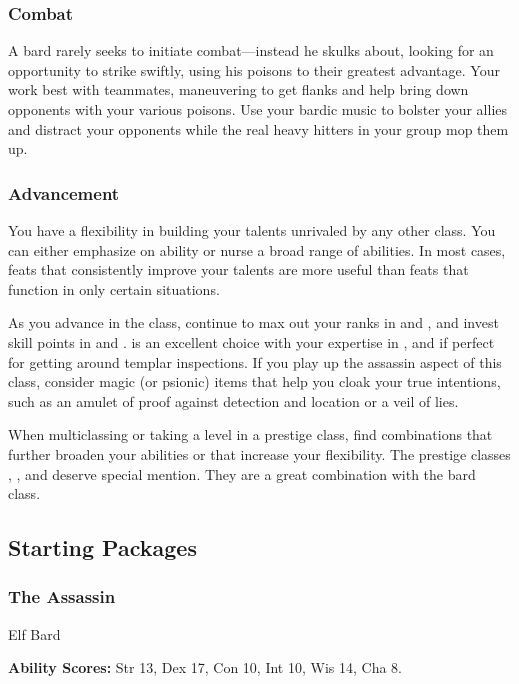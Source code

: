 \subsubsection{Combat}
A bard rarely seeks to initiate combat---instead he skulks about, looking for an opportunity to strike swiftly, using his poisons to their greatest advantage. Your work best with teammates, maneuvering to get flanks and help bring down opponents with your various poisons. Use your bardic music to bolster your allies and distract your opponents while the real heavy hitters in your group mop them up.

\subsubsection{Advancement}
You have a flexibility in building your talents unrivaled by any other class. You can either emphasize on ability or nurse a broad range of abilities. In most cases, feats that consistently improve your talents are more useful than feats that function in only certain situations.

As you advance in the class, continue to max out your ranks in  and , and invest skill points in  and .  is an excellent choice with your expertise in , and  if perfect for getting around templar inspections. If you play up the assassin aspect of this class, consider magic (or psionic) items that help you cloak your true intentions, such as an amulet of proof against detection and location or a veil of lies.

When multiclassing or taking a level in a prestige class, find combinations that further broaden your abilities or that increase your flexibility. The prestige classes , , and  deserve special mention. They are a great combination with the bard class.


\subsection{Starting Packages}
\subsubsection{The Assassin}
Elf Bard

\textbf{Ability Scores:} Str 13, Dex 17, Con 10, Int 10, Wis 14, Cha 8.

